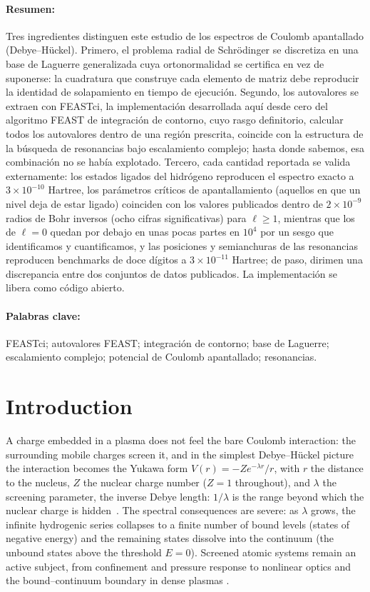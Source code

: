 \documentclass[12pt,twoside]{paper}
\begin{document}
\paragraph{Resumen:} Tres ingredientes distinguen este estudio de los
espectros de Coulomb apantallado (Debye--H\"uckel). Primero, el problema
radial de Schr\"odinger se discretiza en una base de Laguerre generalizada
cuya ortonormalidad se certifica en vez de suponerse: la cuadratura que
construye cada elemento de matriz debe reproducir la identidad de
solapamiento en tiempo de ejecuci\'on. Segundo, los autovalores se
extraen con FEASTci, la implementaci\'on desarrollada aqu\'i desde cero
del algoritmo FEAST de integraci\'on de contorno, cuyo rasgo definitorio,
calcular todos los autovalores dentro de una regi\'on prescrita, coincide
con la estructura de la b\'usqueda de resonancias bajo escalamiento
complejo; hasta donde sabemos, esa combinaci\'on no se hab\'ia explotado.
Tercero, cada cantidad reportada se valida externamente: los estados
ligados del hidr\'ogeno reproducen el espectro exacto a $3\times10^{-10}$
Hartree, los par\'ametros cr\'iticos de apantallamiento (aquellos en que un
nivel deja de estar ligado) coinciden con los valores publicados dentro de
$2\times10^{-9}$ radios de Bohr inversos (ocho cifras significativas) para
$\ell \ge 1$, mientras que los de $\ell = 0$ quedan por debajo en unas
pocas partes en $10^{4}$ por un sesgo que identificamos y cuantificamos,
y las posiciones y semianchuras de las resonancias reproducen benchmarks
de doce d\'igitos a $3\times10^{-11}$ Hartree; de paso, dirimen una
discrepancia entre dos conjuntos de datos publicados. La
implementaci\'on se libera como c\'odigo abierto.

\paragraph{Palabras clave:} FEASTci; autovalores FEAST; integraci\'on de
contorno; base de Laguerre; escalamiento complejo; potencial de Coulomb
apantallado; resonancias.

\section{Introduction}
\label{sec:intro}

A charge embedded in a plasma does not feel the bare Coulomb interaction:
the surrounding mobile charges screen it, and in the simplest
Debye--H\"uckel picture the interaction becomes the Yukawa form
$V(r) = -Z e^{-\lambda r}/r$, with $r$ the distance to the nucleus, $Z$
the nuclear charge number ($Z=1$ throughout), and
$\lambda$ the screening parameter, the inverse Debye length: $1/\lambda$
is the range beyond which the nuclear charge is
hidden~\cite{debye1923theorie,bard2022electrochemical}. The spectral
consequences are severe: as $\lambda$ grows, the infinite hydrogenic
series collapses to a finite number of bound levels (states of negative
energy) and the remaining states dissolve into the continuum (the
unbound states above the threshold $E=0$). Screened atomic systems
remain an active subject, from confinement and pressure response to
nonlinear optics and the bound--continuum boundary in dense plasmas
\cite{Mukherjee2021,Zhou2023epjd,He2023,Yan2024}.
\end{document}
